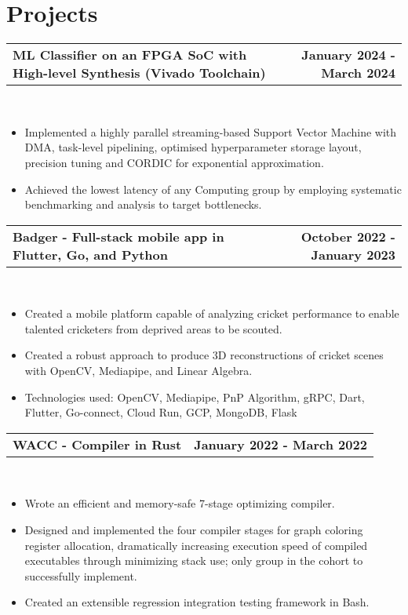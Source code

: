 \documentclass[letterpaper,oneside,10.8pt]{article}
\makeatletter
\newcommand{\titleAndDate}[2]{
  \small{
  \vspace{-1pt}
    \begin{tabular*}{1\textwidth}{l@{\extracolsep{\fill}}r}
      \textbf{#1} & \textbf{#2} \\
    \end{tabular*}\vspace{-1pt} \\
  }
}
\newcommand{\normalText}[1]{
  \small{
    {#1}
  }\vspace{-1pt}\\
}
\makeatother
\begin{document}


\section{Projects}

\titleAndDate{ML Classifier on an FPGA SoC with High-level Synthesis (Vivado Toolchain)}{January 2024 - March 2024}
\begin{itemize}[leftmargin=10pt]
    \item\normalText{Implemented a highly parallel streaming-based Support Vector Machine with DMA, task-level pipelining, optimised hyperparameter storage layout, precision tuning and CORDIC for exponential approximation.}
    \item\normalText{Achieved the lowest latency of any Computing group by employing systematic benchmarking and analysis to target bottlenecks.}
\end{itemize}

\vspace{3pt}

\titleAndDate{Badger - Full-stack mobile app in Flutter, Go, and Python}{October 2022 - January 2023}
\begin{itemize}[leftmargin=10pt]
    \item\normalText{Created a mobile platform capable of analyzing cricket performance to enable talented cricketers from deprived areas to be scouted. }
    \item\normalText{Created a robust approach to produce 3D reconstructions of cricket scenes with OpenCV, Mediapipe, and Linear Algebra. }
    \item\normalText{Technologies used: OpenCV, Mediapipe, PnP Algorithm, gRPC, Dart, Flutter, Go-connect, Cloud Run, GCP, MongoDB, Flask}
\end{itemize}

\vspace{3pt}

\titleAndDate{WACC - Compiler in Rust}{January 2022 - March 2022}
\begin{itemize}[leftmargin=10pt]
    \item\normalText{Wrote an efficient and memory-safe 7-stage optimizing compiler. }
    \item\normalText{Designed and implemented the four compiler stages for graph coloring register allocation, dramatically increasing execution speed of compiled executables through minimizing stack use; only group in the cohort to successfully implement.}
    \item\normalText{Created an extensible regression integration testing framework in Bash. }
\end{itemize}
\end{document}
